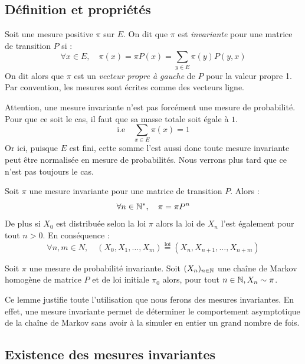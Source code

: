 \subsection{Définition et propriétés}

\begin{definition}
    Soit une mesure positive $ \pi$ sur $E$. On dit que $ \pi$ est \emph{invariante} pour une matrice de transition 
    $P$ si : 
        $$ \boxed{\forall x \in E, \quad \pi(x) = \pi P(x) = \sum_{y \in E} \pi(y)P(y,x)} $$
    On dit alors que $ \pi$ est un \emph{vecteur propre à gauche} de $P$ pour la valeur propre 1. 
    Par convention, les mesures sont écrites comme des vecteurs ligne. 
\end{definition}

\begin{remark}
    Attention, une mesure invariante n'est pas forcément une mesure de probabilité. Pour que ce 
    soit le cas, il faut que sa masse totale soit égale à $1$. 
        $$ \text{i.e} \quad \sum_{x \in E} \pi(x) = 1 $$
    Or ici, puisque $E$ est fini, cette somme l'est aussi donc toute mesure invariante peut être normalisée
    en mesure de probabilités. Nous verrons plus tard que ce n'est pas toujours le cas. 
\end{remark}

\begin{lemma}
    Soit $ \pi$ une mesure invariante pour une matrice de transition $P$. Alors : 
        $$ \forall n \in \mathbb{N}^*, \quad \pi = \pi P^n $$ 
    De plus si $X_0$ est distribuée selon la loi $ \pi$ alors la loi de $X_n$ l'est également 
    pour tout $ n > 0$. En conséquence : 
        $$ \forall n,m \in N, \quad (X_0, X_1, \dots, X_m) \overset{ \text{loi} }{=} (X_n, X_{n+1}, \dots, X_{n+m}) $$
\end{lemma}

\begin{prop}
    Soit $ \pi$ une mesure de probabilité invariante. Soit $(X_n)_{n \in \mathbb{N}}$ une chaîne de Markov homogène de 
    matrice $P$ et de loi initiale $ \pi_0$ alors, pour tout $n \in \mathbb{N}, X_n \sim \pi$. 
\end{prop}

Ce lemme justifie toute l'utilisation que nous ferons des mesures invariantes. En effet, une mesure invariante 
permet de déterminer le comportement asymptotique de la chaîne de Markov sans avoir à la simuler en entier un 
grand nombre de fois. 

\subsection{Existence des mesures invariantes}

